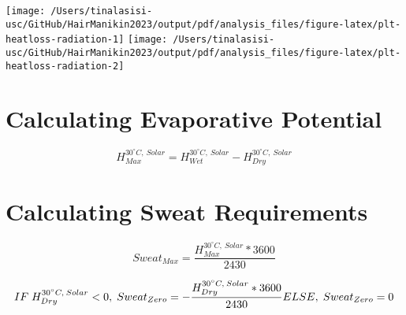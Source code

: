 \documentclass[
]{article}
\newenvironment{Shaded}{\begin{snugshade}}{\end{snugshade}}
\newcommand{\NormalTok}[1]{#1}
\newcommand{\OtherTok}[1]{\textcolor[rgb]{0.56,0.35,0.01}{#1}}
\newcommand{\SpecialCharTok}[1]{\textcolor[rgb]{0.81,0.36,0.00}{\textbf{#1}}}
\begin{document}
\texttt{[image: /Users/tinalasisi-usc/GitHub/HairManikin2023/output/pdf/analysis\_files/figure-latex/plt-heatloss-radiation-1]}
\texttt{[image: /Users/tinalasisi-usc/GitHub/HairManikin2023/output/pdf/analysis\_files/figure-latex/plt-heatloss-radiation-2]}

\hypertarget{calculating-evaporative-potential}{%
\section{Calculating Evaporative
Potential}\label{calculating-evaporative-potential}}

\[H_{Max}^{30^{\circ} C,\:Solar} = H_{Wet}^{30^{\circ} C,\:Solar} - H_{Dry}^{30^{\circ} C,\:Solar}\]

\begin{Shaded}
\end{Shaded}

\hypertarget{calculating-sweat-requirements}{%
\section{Calculating Sweat
Requirements}\label{calculating-sweat-requirements}}

\[Sweat_{Max} = \frac{H_{Max}^{30^{\circ} C,\:Solar} * 3600}{2430}\]

\[ IF \; H_{Dry}^{30^{\circ} C,\:Solar} < 0, \; Sweat_{Zero} = -\frac{H_{Dry}^{30^{\circ} C,\:Solar} * 3600}{2430} \\
ELSE, \; Sweat_{Zero} = 0\]
\end{document}
